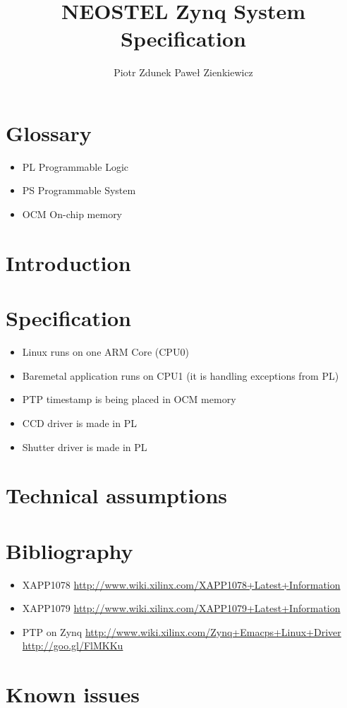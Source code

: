 \documentclass[10pt,a4paper,oneside]{article}
\author{Piotr Zdunek Paweł Zienkiewicz}
\title{NEOSTEL Zynq System Specification}
\begin{document}
\section{Glossary}
\begin{itemize}
\item{PL} Programmable Logic
\item{PS} Programmable System
\item{OCM} On-chip memory
\end{itemize}
\section{Introduction}
\section{Specification}
\begin{itemize}
\item Linux runs on one ARM Core (CPU0)
\item Baremetal application runs on CPU1 (it is handling exceptions from PL)
\item PTP timestamp is being placed in OCM memory
\item CCD driver is made in PL
\item Shutter driver is made in PL
\end{itemize}
\section{Technical assumptions}

\section{Bibliography}
\begin{itemize}
\item XAPP1078 \url{http://www.wiki.xilinx.com/XAPP1078+Latest+Information}
\item XAPP1079 \url{http://www.wiki.xilinx.com/XAPP1079+Latest+Information}
\item PTP on Zynq \url{http://www.wiki.xilinx.com/Zynq+Emacps+Linux+Driver}
\url{http://goo.gl/FlMKKu}
\end{itemize}

\section{Known issues}
\end{document}
